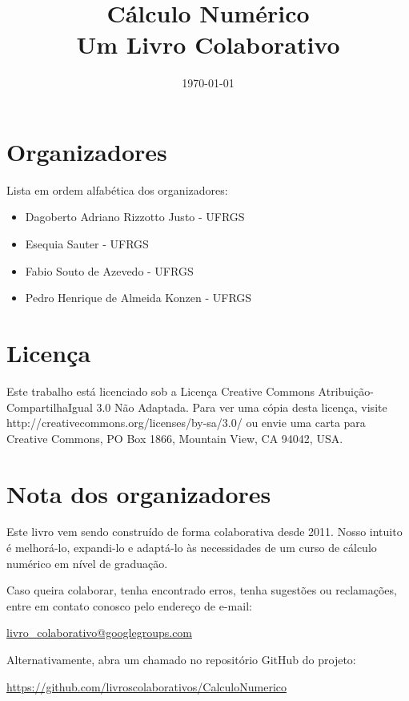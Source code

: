 \documentclass[12pt,a4paper]{book}
\begin{document}
\frontmatter

\title{Cálculo Numérico\\\small{Um Livro Colaborativo}}
\author{}
\date{\today}

\AddToShipoutPicture*{\BackgroundPic}
\maketitle


\chapter*{Organizadores}

Lista em ordem alfabética dos organizadores:
\begin{itemize}
\item[] Dagoberto Adriano Rizzotto Justo - UFRGS
\item[] Esequia Sauter - UFRGS
\item[] Fabio Souto de Azevedo - UFRGS
\item[] Pedro Henrique de Almeida Konzen - UFRGS
\end{itemize}

\chapter*{Licença}

Este trabalho está licenciado sob a Licença Creative Commons Atribuição-CompartilhaIgual 3.0 Não Adaptada. Para ver uma cópia desta licença, visite http://creativecommons.org/licenses/by-sa/3.0/ ou envie uma carta para Creative Commons, PO Box 1866, Mountain View, CA 94042, USA.
 
\chapter*{Nota dos organizadores}

Este livro vem sendo construído de forma colaborativa desde 2011. Nosso intuito é melhorá-lo, expandi-lo e adaptá-lo às necessidades de um curso de cálculo numérico em nível de graduação.

Caso queira colaborar, tenha encontrado erros, tenha sugestões ou reclamações, entre em contato conosco pelo endereço de e-mail:
\begin{center}
\url{livro_colaborativo@googlegroups.com}  
\end{center}
Alternativamente, abra um chamado no repositório GitHub do projeto:
\begin{center}
\url{https://github.com/livroscolaborativos/CalculoNumerico}  
\end{center}
\end{document}
